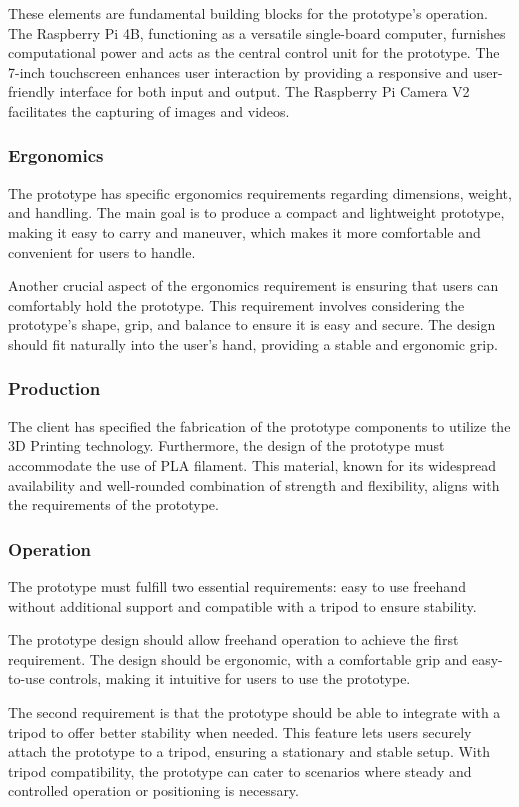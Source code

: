 These elements are fundamental building blocks for the prototype's operation. The Raspberry Pi 4B, functioning as a versatile single-board computer, furnishes computational power and acts as the central control unit for the prototype. The 7-inch touchscreen enhances user interaction by providing a responsive and user-friendly interface for both input and output. The Raspberry Pi Camera V2 facilitates the capturing of images and videos.

\subsubsection{Ergonomics}
The prototype has specific ergonomics requirements regarding dimensions, weight, and handling. The main goal is to produce a compact and lightweight prototype, making it easy to carry and maneuver, which makes it more comfortable and convenient for users to handle.

Another crucial aspect of the ergonomics requirement is ensuring that users can comfortably hold the prototype. This requirement involves considering the prototype's shape, grip, and balance to ensure it is easy and secure. The design should fit naturally into the user's hand, providing a stable and ergonomic grip.

\subsubsection{Production}
The client has specified the fabrication of the prototype components to utilize the 3D Printing technology. Furthermore, the design of the prototype must accommodate the use of PLA filament. This material, known for its widespread availability and well-rounded combination of strength and flexibility, aligns with the requirements of the prototype.

\subsubsection{Operation}
The prototype must fulfill two essential requirements: easy to use freehand without additional support and compatible with a tripod to ensure stability.

The prototype design should allow freehand operation to achieve the first requirement. The design should be ergonomic, with a comfortable grip and easy-to-use controls, making it intuitive for users to use the prototype.

The second requirement is that the prototype should be able to integrate with a tripod to offer better stability when needed. This feature lets users securely attach the prototype to a tripod, ensuring a stationary and stable setup. With tripod compatibility, the prototype can cater to scenarios where steady and controlled operation or positioning is necessary.

